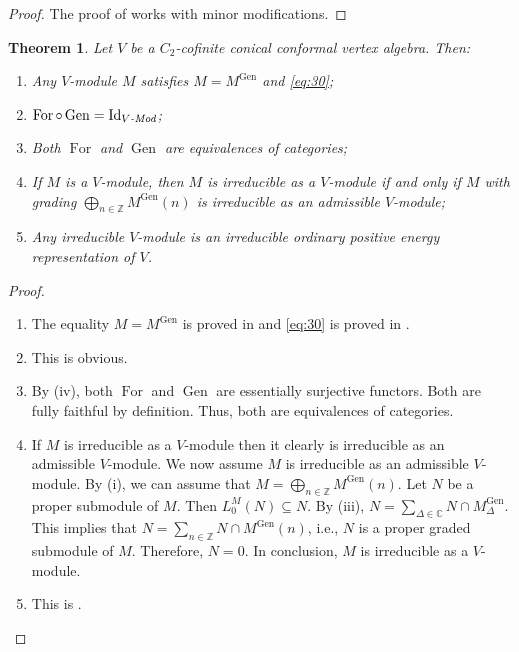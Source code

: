 \documentclass[a4paper, 12pt, reqno]{amsart}
\newtheorem{theorem}{Theorem}[section]
\theoremstyle{remark}
\DeclareMathOperator{\Id}{Id}
\DeclareMathOperator{\For}{For}
\DeclareMathOperator{\Gen}{Gen}
\begin{document}
\begin{proof}
  The proof of  works with minor modifications.
\end{proof}

\begin{theorem}
  \label{thr:58}
  Let $V$ be a $C_2$-cofinite conical conformal vertex algebra.
  Then:
  \begin{enumerate}
  \item Any $V$-module $M$ satisfies $M = M^{\Gen}$ and \eqref{eq:30};
  \item $\For\circ\Gen = \Id_{\text{\emph{$V$-Mod}}}$;
  \item Both $\For$ and $\Gen$ are equivalences of categories;
  \item If $M$ is a $V$-module, then $M$ is irreducible as a $V$-module if and only if $M$ with grading $\bigoplus_{n \in \mathbb{Z}}M^{\Gen}(n)$ is irreducible as an admissible $V$-module;
  \item Any irreducible $V$-module is an irreducible ordinary positive energy representation of $V$.
  \end{enumerate}
\end{theorem}

\begin{proof}\leavevmode
  \begin{enumerate}
  \item The equality $M = M^{\Gen}$ is proved in \cite[Proposition 5.7]{abe_rationality_2003} and \eqref{eq:30} is proved in \cite[Lemma 5.6]{abe_rationality_2003}.
  \item This is obvious.
  \item By (iv), both $\For$ and $\Gen$ are essentially surjective functors.
    Both are fully faithful by definition.
    Thus, both are equivalences of categories.
  \item If $M$ is irreducible as a $V$-module then it clearly is irreducible as an admissible $V$-module.
    We now assume $M$ is irreducible as an admissible $V$-module.
    By (i), we can assume that $M = \bigoplus_{n \in \mathbb{Z}}M^{\Gen}(n)$.
    Let $N$ be a proper submodule of $M$.
    Then $L_0^M(N) \subseteq N$.
    By (iii), $N = \sum_{\Delta \in \mathbb{C}}N \cap M^{\Gen}_{\Delta}$.
    This implies that $N = \sum_{n \in \mathbb{Z}}N \cap M^{\Gen}(n)$, i.e., $N$ is a proper graded submodule of $M$.
    Therefore, $N = 0$.
    In conclusion, $M$ is irreducible as a $V$-module.
  \item This is \cite[Corollary 5.8]{abe_rationality_2003}. \qedhere
  \end{enumerate}
\end{proof}
\end{document}
